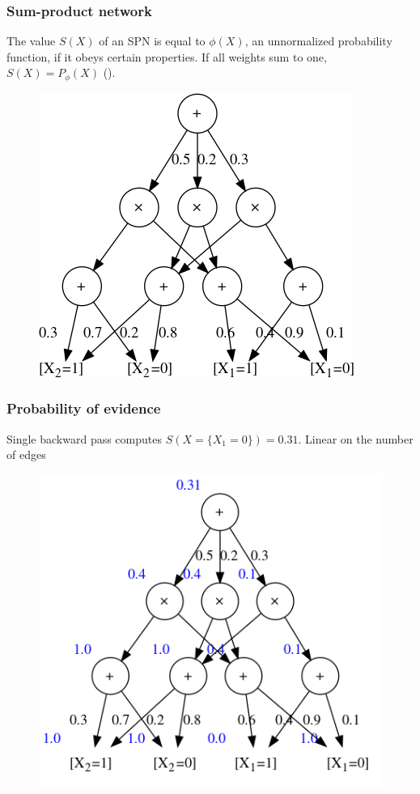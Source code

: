\documentclass{beamer}
\begin{document}
\begin{frame}
  \frametitle{Sum-product network}

  The value $S(X)$ of an SPN is equal to $\phi(X)$, an unnormalized probability function, if it
  obeys certain properties. If all weights sum to one, $S(X)=P_{\phi}(X)$ (\cite{poon-domingos}).

  \begin{figure}
    \centering\includegraphics[height=0.6\textheight]{imgs/sample_spn.png}
  \end{figure}
\end{frame}

\begin{frame}
  \frametitle{Probability of evidence}

  Single backward pass computes $S(X=\{X_1=0\})=0.31$. Linear on the number of edges

  \begin{figure}
    \centering\includegraphics[height=0.6\textheight]{imgs/sample_spn_prob.png}
  \end{figure}
\end{frame}
\end{document}
